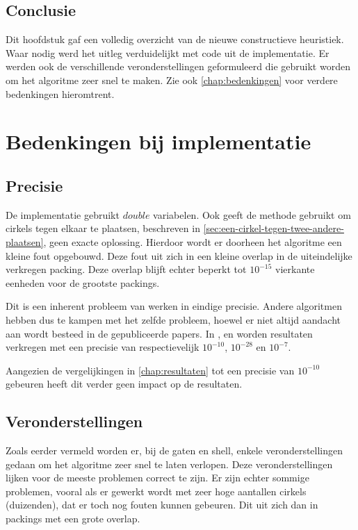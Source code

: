 \documentclass[12pt,a4paper,oneside]{book}
\begin{document}
\section{Conclusie}

Dit hoofdstuk gaf een volledig overzicht van de nieuwe constructieve heuristiek.
Waar nodig werd het uitleg verduidelijkt met code uit de implementatie.
Er werden ook de verschillende veronderstellingen geformuleerd die gebruikt worden om het algoritme zeer snel te maken.
Zie ook \autoref{chap:bedenkingen} voor verdere bedenkingen hieromtrent.


\chapter{Bedenkingen bij implementatie} \label{chap:bedenkingen}

\section{Precisie}

De implementatie gebruikt $double$ variabelen.
Ook geeft de methode gebruikt om cirkels tegen elkaar te plaatsen, beschreven in \autoref{sec:een-cirkel-tegen-twee-andere-plaatsen}, geen exacte oplossing.
Hierdoor wordt er doorheen het algoritme een kleine fout opgebouwd.
Deze fout uit zich in een kleine overlap in de uiteindelijke verkregen packing.
Deze overlap blijft echter beperkt tot $10^{-15}$ vierkante eenheden voor de grootste packings.

Dit is een inherent probleem van werken in eindige precisie.
Andere algoritmen hebben dus te kampen met het zelfde probleem, hoewel er niet altijd aandacht aan wordt besteed in de gepubliceerde papers.
In \cite{akeb2006basic}, \cite{ye2013iterated} en \cite{m2013packing} worden resultaten verkregen met een precisie van respectievelijk $10^{-10}$, $10^{-28}$ en $10^{-7}$.


Aangezien de vergelijkingen in \autoref{chap:resultaten} tot een precisie van $10^{-10}$ gebeuren heeft dit verder geen impact op de resultaten.

\section{Veronderstellingen}

Zoals eerder vermeld worden er, bij de gaten en shell, enkele veronderstellingen gedaan om het algoritme zeer snel te laten verlopen.
Deze veronderstellingen lijken voor de meeste problemen correct te zijn.
Er zijn echter sommige problemen, vooral als er gewerkt wordt met zeer hoge aantallen cirkels (duizenden), dat er toch nog fouten kunnen gebeuren.
Dit uit zich dan in packings met een grote overlap.
\end{document}
